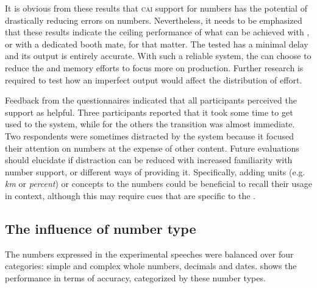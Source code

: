 \documentclass[output=paper]{langsci/langscibook}
\begin{document}
It is obvious from these results that \textsc{cai} support for numbers has the potential of drastically reducing errors on numbers. Nevertheless, it needs to be emphasized that these results indicate the ceiling performance of what can be achieved with , or with a dedicated booth mate, for that matter. The tested  has a minimal delay and its output is entirely accurate. With such a reliable system, the  can choose to reduce the  and memory efforts to focus more on production. Further research is required to test how an imperfect output would affect the distribution of effort.

Feedback from the questionnaires indicated that all participants perceived the support as helpful. Three participants reported that it took some time to get used to the system, while for the others the transition was almost immediate. Two respondents were sometimes distracted by the system because it focused their attention on numbers at the expense of other content. Future evaluations should elucidate if distraction can be reduced with increased familiarity with number support, or different ways of providing it. Specifically, adding units (e.g. \textit{km} or \textit{percent}) or concepts to the numbers could be beneficial to recall their usage in context, although this may require cues that are specific to the .

\subsection{The influence of number type}\largerpage
The numbers expressed in the experimental speeches were balanced over four categories: simple and complex whole numbers, decimals and dates.  shows the performance in terms of accuracy, categorized by these number types.
\end{document}
